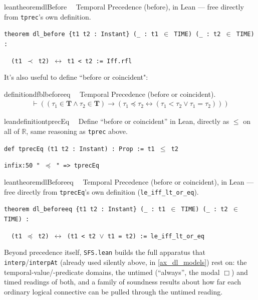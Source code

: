 \begin{restatable}{leantheorem}{dlBefore}~~ Temporal Precedence (before), in Lean ---
free directly from \texttt{tprec}'s own definition.

\texttt{\textcolor{leancolor}{theorem} \textcolor{leanyellow}{dl\_before} \{t1 t2 : Instant\} (\_ : t1 $\in$ TIME) (\_ : t2 $\in$ TIME) :}

\texttt{~~(t1 $\prec$ t2) $\leftrightarrow$ t1 < t2 := Iff.rfl}
\label{dl_before}
\end{restatable}

\pn It's also useful to define ``before or coincident":

\begin{restatable}{definition}{dfblbeforeeq}~~ Temporal Precedence (before or
coincident).
\begin{align}
\vdash ( ( \tau_1 \in \mathbf{T} \wedge \tau_2 \in \mathbf{T} ) \rightarrow (
    \tau_1 \preccurlyeq \tau_2 \leftrightarrow ( \tau_1 < \tau_2 \vee \tau_1 =
    \tau_2 ) ) )\label{eq:df-bl.beforeeq}\tag{df-bl.beforeeq}
\end{align}
\end{restatable}

\begin{restatable}{leandefinition}{tprecEq}~~ Define ``before or coincident'' in Lean,
directly as $\le$ on all of $\mathbb{R}$, same reasoning as \texttt{tprec} above.

\texttt{\textcolor{leancolor}{def} \textcolor{leanyellow}{tprecEq} (t1 t2 : Instant) : Prop := t1 $\le$ t2}

\texttt{\textcolor{leancolor}{infix:50} " $\preccurlyeq$ " => tprecEq}
\label{tprecEq}
\end{restatable}

\begin{restatable}{leantheorem}{dlBeforeeq}~~ Temporal Precedence (before or
coincident), in Lean --- free directly from \texttt{tprecEq}'s own definition (\texttt{le\_iff\_lt\_or\_eq}).

\texttt{\textcolor{leancolor}{theorem} \textcolor{leanyellow}{dl\_beforeeq} \{t1 t2 : Instant\} (\_ : t1 $\in$ TIME) (\_ : t2 $\in$ TIME) :}

\texttt{~~(t1 $\preccurlyeq$ t2) $\leftrightarrow$ (t1 < t2 $\vee$ t1 = t2) := le\_iff\_lt\_or\_eq}
\label{dl_beforeeq}
\end{restatable}

\pn Beyond precedence itself, \texttt{SFS.lean} builds the full apparatus that \texttt{interp}/\texttt{interpAt} (already used silently above, in \ref{ax_dl_models}) rest on: the temporal-value/-predicate domains, the untimed (``always'', the modal $\Box$) and timed readings of both, and a family of soundness results about how far each ordinary logical connective can be pulled through the untimed reading.

